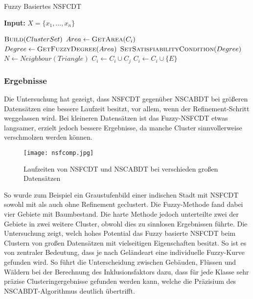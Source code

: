 \documentclass[11pt,ceqn]{book}
\begin{document}
\begin{algorithm}[H]
\caption{Fuzzy Basiertes NSFCDT}\label{nsfcdt}
\hspace*{\algorithmicindent} \textbf{Input:} $X=\{x_1,\dots,x_n\}$ 
\begin{algorithmic}[1]
\State $\textsc{Build} (ClusterSet)$
\State $Area \gets \textsc{Get}\textsc{Area}(C_i)$
\State $Degree \gets \textsc{Get}\textsc{Fuzzy}\textsc{Degree}(Area)$
\State $\textsc{Set}\textsc{Satisfiability}\textsc{Condition}(Degree)$
\State $N \gets Neighbour(Triangle)$
\State $C_i \gets C_i \cup C_j$
\Else 
\State $C_i \gets C_i \cup \{E\}$
\EndIf
\EndIf
\EndFor
\EndFor
\EndFor
\end{algorithmic}
\end{algorithm} 

\subsubsection{Ergebnisse}
Die Untersuchung hat gezeigt, dass NSFCDT gegenüber NSCABDT bei größeren Datensätzen eine bessere Laufzeit besitzt, vor allem, wenn der Refinement-Schritt weggelassen wird. Bei kleineren Datensätzen ist das Fuzzy-NSFCDT etwas langsamer, erzielt jedoch bessere Ergebnisse, da manche Cluster sinnvollerweise verschmolzen werden können.

\begin{figure}[H]
\centering
\texttt{[image: nsfcomp.jpg]}
\caption{Laufzeiten von NSFCDT und NSCABDT bei verschieden großen Datensätzen}
\end{figure}

So wurde zum Beispiel ein Graustufenbild einer indischen Stadt mit NSFCDT sowohl mit als auch ohne Refinement geclustert. Die Fuzzy-Methode fand dabei vier Gebiete mit Baumbestand. Die harte Methode jedoch unterteilte zwei der Gebiete in zwei weitere Cluster, obwohl dies zu sinnlosen Ergebnissen führte. Die Untersuchung zeigt, welch hohes Potential das Fuzzy basierte NSFCDT beim Clustern von großen Datensätzen mit vielseitigen Eigenschaften besitzt. So ist es von zentraler Bedeutung, dass je nach Geländeart eine individuelle Fuzzy-Kurve gefunden wird. So führt die Unterscheidung zwischen Gebäuden, Flüssen und Wäldern bei der Berechnung des Inklusionsfaktors dazu, dass für jede Klasse sehr präzise Clusteringergebnisse gefunden werden kann, welche die Präzisium des NSCABDT-Algorithmus deutlich übertrifft.
\end{document}
